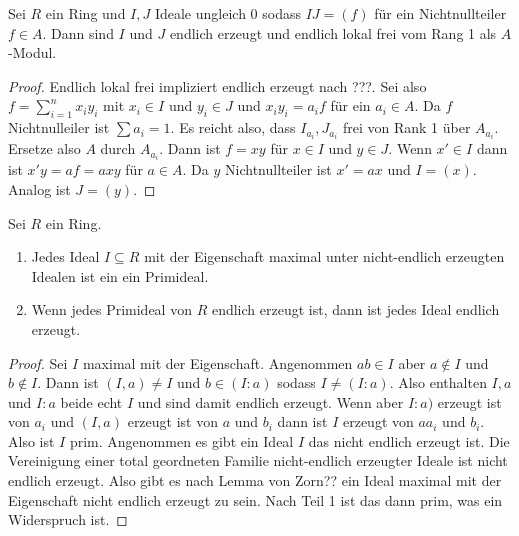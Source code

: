 \begin{Satz}
\begin{enumerate}
	\end{enumerate}
	\begin{Lemma}
		Sei \(R\) ein Ring und \(I,J\) Ideale ungleich \(0\) sodass \(IJ=(f)\) für ein Nichtnullteiler \(f\in A\).
		Dann sind \(I\) und \(J\) endlich erzeugt und endlich lokal frei vom Rang 1 als \(A\)-Modul.
	\end{Lemma}
	\begin{proof}
		Endlich lokal frei impliziert endlich erzeugt nach ???.
		Sei also \(f=\sum_{i=1}^nx_iy_i\) mit \(x_i\in I\) und \(y_i\in J\) und \(x_iy_i=a_if\) für ein \(a_i\in A\).
		Da \(f\) Nichtnulleiler ist \(\sum a_i=1\). Es reicht also, dass \(I_{a_i},J_{a_i}\) frei von Rank 1 über \(A_{a_i}\).
		Ersetze also \(A\) durch \(A_{a_i}\). Dann ist \(f=xy\) für \(x\in I\) und \(y\in J\).
		Wenn \(x'\in I\) dann ist \(x'y=af=axy\) für \(a\in A\). Da \(y\) Nichtnullteiler ist \(x'=ax\) und \(I=(x)\). Analog ist
		\(J=(y)\).
	\end{proof}
	\begin{Lemma}
		Sei \(R\) ein Ring.
		\begin{enumerate}
			\item Jedes Ideal \(I\subseteq R\) mit der Eigenschaft maximal unter nicht-endlich erzeugten Idealen ist ein ein Primideal.
			\item Wenn jedes Primideal von \(R\) endlich erzeugt ist, dann ist jedes Ideal endlich erzeugt.
		\end{enumerate}
	\end{Lemma}
	\begin{proof}
		Sei \(I\) maximal mit der Eigenschaft. Angenommen \(ab\in I\) aber \(a\not\in I\) und \(b\not\in I\).
		Dann ist \((I,a)\neq I\) und \(b\in (I:a)\) sodass \(I\neq (I:a)\). Also enthalten \(I,a\) und \(I:a\) beide echt 
		\(I\) und sind damit endlich erzeugt. Wenn aber \(I:a)\) erzeugt ist von \(a_i\) und \((I,a)\) erzeugt ist von
		\(a\) und \(b_i\) dann ist \(I\) erzeugt von \(aa_i\) und \(b_i\). Also ist \(I\) prim.
		Angenommen es gibt ein Ideal \(I\) das nicht endlich erzeugt ist.
		Die Vereinigung einer total geordneten Familie nicht-endlich erzeugter Ideale ist nicht endlich erzeugt.
		Also gibt es nach Lemma von Zorn?? ein Ideal maximal mit der Eigenschaft nicht endlich erzeugt zu sein. Nach Teil 1
		ist das dann prim, was ein Widerspruch ist.
	\end{proof}
\end{Satz}

